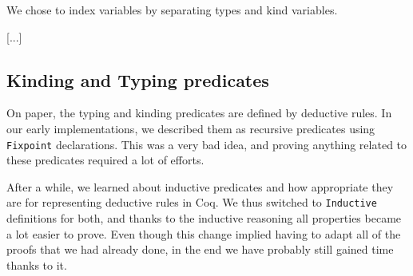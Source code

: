 \documentclass[a4paper,11pt]{article}
\begin{document}
We chose to index variables by separating types and kind variables.

[...]

\subsection{Kinding and Typing predicates}

On paper, the typing and kinding predicates are defined by deductive
rules. In our early implementations, we described them as recursive
predicates using \verb|Fixpoint| declarations. This was a very bad
idea, and proving anything related to these predicates required a lot
of efforts.

After a while, we learned about inductive predicates and how
appropriate they are for representing deductive rules in Coq. We thus
switched to \verb|Inductive| definitions for both, and thanks to the
inductive reasoning all properties became a lot easier to prove. Even
though this change implied having to adapt all of the proofs that we
had already done, in the end we have probably still gained time thanks
to it.
\end{document}
